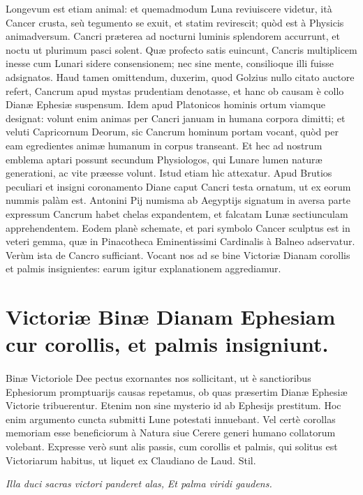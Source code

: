 \documentclass[a4paper, 11pt, oneside, polutonikogreek, latin]{article}
\begin{document}
Longevum est etiam animal: et quemadmodum Luna reviuiscere videtur, ità Cancer crusta, seù tegumento se exuit, et statim revirescit; quòd est à Physicis animadversum. Cancri præterea ad nocturni luminis splendorem accurrunt, et noctu ut plurimum pasci solent. Quæ profecto satis euincunt, Cancris multiplicem inesse cum Lunari sidere consensionem; nec sine mente, consilioque illi fuisse adsignatos. Haud tamen omittendum, duxerim, quod Golzius nullo citato auctore refert, Cancrum apud mystas prudentiam denotasse, et hanc ob causam è collo Dianæ Ephesiæ suspensum. Idem apud Platonicos hominis ortum viamque designat: volunt enim animas per Cancri januam in humana corpora dimitti; et veluti Capricornum Deorum, sic Cancrum hominum portam vocant, quòd per eam egredientes animæ humanum in corpus transeant. Et hec ad nostrum emblema aptari possunt secundum Physiologos, qui Lunare lumen naturæ generationi, ac vite præesse volunt. Istud etiam hìc attexatur. Apud Brutios peculiari et insigni coronamento Diane caput Cancri testa ornatum, ut ex eorum nummis palàm est. Antonini Pij numisma ab Aegyptijs signatum in aversa parte expressum Cancrum habet chelas expandentem, et falcatam Lunæ sectiunculam apprehendentem. Eodem planè schemate, et pari symbolo Cancer sculptus est in veteri gemma, quæ in Pinacotheca Eminentissimi Cardinalis à Balneo adservatur. Verùm ista de Cancro sufficiant. Vocant nos ad se bine Victoriæ Dianam corollis et palmis insignientes: earum igitur explanationem aggrediamur.
\clearpage
\section{Victoriæ Binæ Dianam Ephesiam cur corollis, et palmis insigniunt.}
\paragraph{}
Binæ Victoriole Dee pectus exornantes nos sollicitant, ut è sanctioribus Ephesiorum promptuarijs causas repetamus, ob quas præsertim Dianæ Ephesiæ Victorie tribuerentur. Etenim non sine mysterio id ab Ephesijs prestitum. Hoc enim argumento cuncta submitti Lune potestati innuebant. Vel certè corollas memoriam esse beneficiorum à Natura siue Cerere generi humano collatorum volebant. Expresse verò sunt alis passis, cum corollis et palmis, qui solitus est Victoriarum habitus, ut liquet ex Claudiano de Laud. Stil.

\emph{Illa duci sacras victori panderet alas,}
\emph{Et palma viridi gaudens.}
\end{document}
